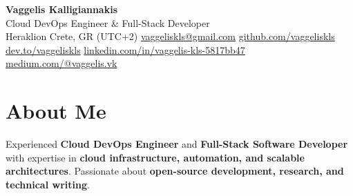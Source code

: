 \documentclass[a4paper,10pt]{article}
\begin{document}
\pagestyle{empty}

\begin{center}
    {\huge \textbf{Vaggelis Kalligiannakis} } \\
    \vspace{7pt}
    {\large Cloud DevOps Engineer \& Full-Stack Developer} \\
    \vspace{7pt}
     Heraklion Crete, GR (UTC+2) \quad
     \href{mailto:vaggeliskls@gmail.com}{vaggeliskls@gmail.com} \quad
     \href{https://github.com/vaggeliskls}{github.com/vaggeliskls} \quad
     \href{https://dev.to/vaggeliskls}{dev.to/vaggeliskls} \quad
     \href{https://www.linkedin.com/in/vaggelis-kls-5817bb47/}{linkedin.com/in/vaggelis-kls-5817bb47} \quad
     \href{https://medium.com/@vaggelis.vk}{medium.com/@vaggelis.vk}
\end{center}

\vspace{4pt}

\section*{ About Me}
Experienced \textbf{Cloud DevOps Engineer} and \textbf{Full-Stack Software Developer} with expertise in \textbf{cloud infrastructure, automation, and scalable architectures}.  
Passionate about \textbf{open-source development, research, and technical writing}.

\vspace{2pt}

\end{document}
